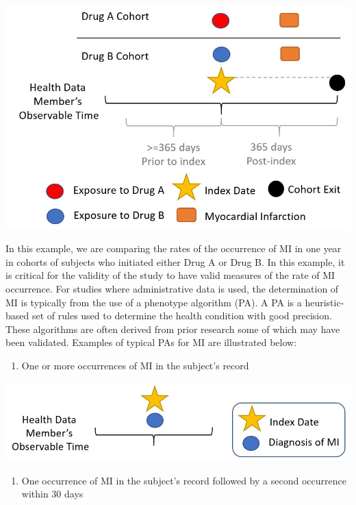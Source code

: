 \documentclass[11pt]{book}
\providecommand{\tightlist}{%
  \setlength{\itemsep}{0pt}\setlength{\parskip}{0pt}}
\theoremstyle{definition}
\theoremstyle{definition}
\theoremstyle{definition}
\theoremstyle{remark}
\begin{document}
\begin{center}\includegraphics[width=0.75\linewidth]{images/ClinicalValidity/figure1} \end{center}

In this example, we are comparing the rates of the occurrence of MI in one year in cohorts of subjects who initiated either Drug A or Drug B. In this example, it is critical for the validity of the study to have valid measures of the rate of MI occurrence. For studies where administrative data is used, the determination of MI is typically from the use of a phenotype algorithm (PA). A PA is a heuristic-based set of rules used to determine the health condition with good precision. These algorithms are often derived from prior research some of which may have been validated. Examples of typical PAs for MI are illustrated below:

\begin{enumerate}
\def\labelenumi{\arabic{enumi})}
\tightlist
\item
  One or more occurrences of MI in the subject's record
\end{enumerate}

\begin{center}\includegraphics[width=0.75\linewidth]{images/ClinicalValidity/figure2} \end{center}

\begin{enumerate}
\def\labelenumi{\arabic{enumi})}
\setcounter{enumi}{1}
\tightlist
\item
  One occurrence of MI in the subject's record followed by a second occurrence within 30 days
\end{enumerate}
\end{document}
